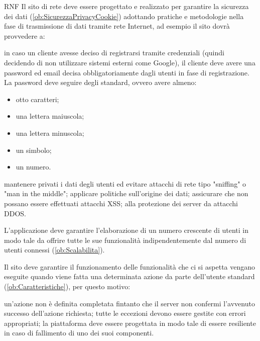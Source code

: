 \begin{listaPersonale}{RNF}
       Il sito di rete deve essere progettato e realizzato per garantire la sicurezza dei dati (\ref{ob:SicurezzaPrivacyCookie}) adottando pratiche e metodologie nella fase di trasmissione di dati tramite rete Internet, ad esempio il sito dovrà provvedere a:
      \begin{listaPersonale2}[RNF]{}
             in caso un cliente avesse deciso di registrarsi tramite credenziali (quindi decidendo di non utilizzare sistemi esterni come Google), il cliente deve avere una password ed email decisa obbligatoriamente dagli utenti in fase di registrazione. La password deve seguire degli standard, ovvero avere almeno:
            \begin{itemize}
                  \item otto caratteri;
                  \item una lettera maiuscola;
                  \item una lettera minuscola;
                  \item un simbolo;
                  \item un numero.
            \end{itemize}
             mantenere privati i dati degli utenti ed evitare attacchi di rete tipo "sniffing" o "man in the middle";
             applicare politiche sull'origine dei dati;
             assicurare che non possano essere effettuati attacchi XSS;
             alla protezione dei server da attacchi DDOS.
      \end{listaPersonale2}

       L'applicazione deve garantire l'elaborazione di un numero crescente di utenti in modo tale da offrire tutte le sue funzionalità indipendentemente dal numero di utenti connessi (\ref{ob:Scalabilita}).

       Il sito deve garantire il funzionamento delle funzionalità che ci si aspetta vengano eseguite quando viene fatta una determinata azione da parte dell'utente standard (\ref{ob:Caratteristiche}), per questo motivo:
      \begin{listaPersonale2}[RNF]{}
             un'azione non è definita completata fintanto che il server non confermi l'avvenuto successo dell'azione richiesta;
             tutte le eccezioni devono essere gestite con errori appropriati;
             la piattaforma deve essere progettata in modo tale di essere resiliente in caso di fallimento di uno dei suoi componenti.
      \end{listaPersonale2}


\end{listaPersonale}

